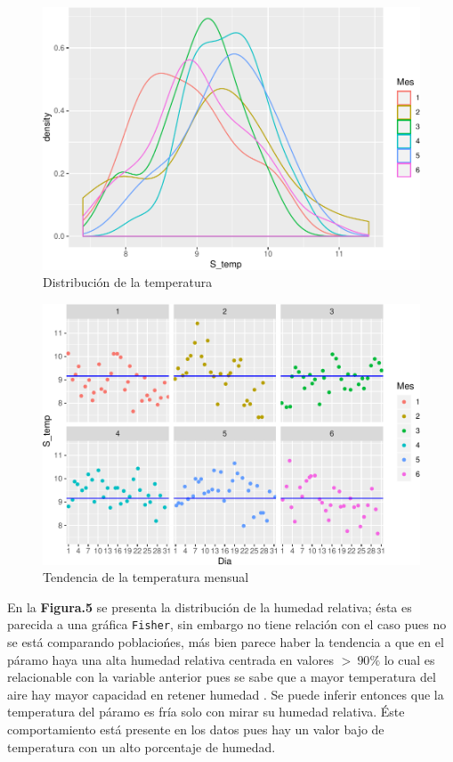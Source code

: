 \documentclass[conference,final,]{IEEEtran}
\makeatletter
\def\maxwidth{\ifdim\Gin@nat@width>\linewidth\linewidth
\else\Gin@nat@width\fi}
\let\Oldincludegraphics\includegraphics
\renewcommand{\includegraphics}[1]{\Oldincludegraphics[width=\maxwidth]{#1}}
\makeatother
\begin{document}
\begin{figure}
\centering
\includegraphics{Hidrology_files/figure-latex/unnamed-chunk-5-1.pdf}
\caption{Distribución de la temperatura}
\end{figure}

\begin{figure}
\centering
\includegraphics{Hidrology_files/figure-latex/unnamed-chunk-6-1.pdf}
\caption{Tendencia de la temperatura mensual}
\end{figure}

En la \textbf{Figura.5} se presenta la distribución de la humedad relativa;
ésta es parecida a una gráfica \texttt{Fisher}, sin embargo no tiene
relación con el caso pues no se está comparando poblaciońes, más bien
parece haber la tendencia a que en el páramo haya una alta humedad
relativa centrada en valores \(> \ 90 \%\) lo cual es relacionable con
la variable anterior pues se sabe que a mayor temperatura del aire hay
mayor capacidad en retener humedad \citep{jaramillo}. Se puede inferir
entonces que la temperatura del páramo es fría solo con mirar su humedad
relativa. Éste comportamiento está presente en los datos pues hay un
valor bajo de temperatura con un alto porcentaje de humedad.
\end{document}
